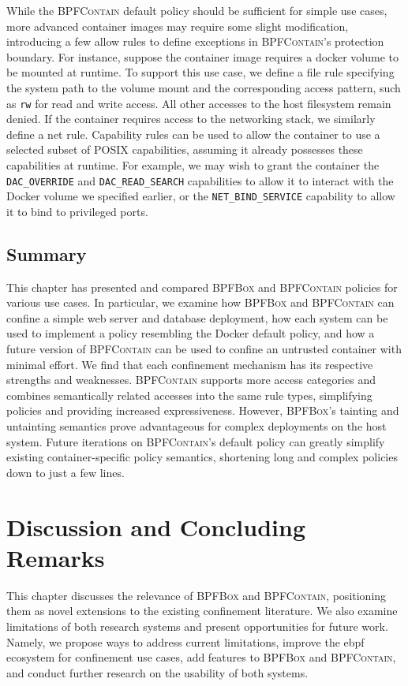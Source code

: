 \documentclass[
  fontsize=12pt,
  titlepage=firstiscover,
  paper=letter,
oneside,
  cleardoublepage=plain,
  parskip=half-,
  DIV=10,
  parindent,
  appendixprefix,
  chapterprefix,
  listof=totoc,
]{scrbook}
\newcommand{\bpfbox}{\textsc{BPFBox}}
\newcommand{\bpfcontain}{\textsc{BPFContain}}
\begin{document}
While the \bpfcontain{} default policy should be sufficient for simple use cases, more
advanced container images may require some slight modification, introducing a few allow
rules to define exceptions in \bpfcontain{}'s protection boundary. For instance, suppose
the container image requires a docker volume to be mounted at runtime. To support this use
case, we define a file rule specifying the system path to the volume mount and the
corresponding access pattern, such as \texttt{rw} for read and write access. All other
accesses to the host filesystem remain denied. If the container requires access to the
networking stack, we similarly define a net rule.  Capability rules can be used to allow
the container to use a selected subset of POSIX capabilities, assuming it already
possesses these capabilities at runtime. For example, we may wish to grant the container
the \texttt{DAC\_OVERRIDE} and \texttt{DAC\_READ\_SEARCH} capabilities to allow it to
interact with the Docker volume we specified earlier, or the \texttt{NET\_BIND\_SERVICE}
capability to allow it to bind to privileged ports.




\section{Summary}

This chapter has presented and compared \bpfbox{} and \bpfcontain{} policies for various
use cases. In particular, we examine how \bpfbox{} and \bpfcontain{} can confine a simple
web server and database deployment,  how each system can be used to implement a policy
resembling the Docker default policy, and how a future version of \bpfcontain{} can be
used to confine an untrusted container with minimal effort. We find that each confinement
mechanism has its respective strengths and weaknesses.  \bpfcontain{} supports more access
categories and combines semantically related accesses into the same rule types,
simplifying policies and providing increased expressiveness. However, \bpfbox{}'s tainting
and untainting semantics prove advantageous for complex deployments on the host system.
Future iterations on \bpfcontain{}'s default policy can greatly simplify existing
container-specific policy semantics, shortening long and complex policies down to just
a few lines.

\chapter{Discussion and Concluding Remarks}\label{c:discussion}
This chapter discusses the relevance of \bpfbox{} and \bpfcontain{}, positioning them as
novel extensions to the existing confinement literature. We also examine
limitations of both research systems and present opportunities for future work. Namely, we
propose ways to address current limitations, improve the \gls{ebpf} ecosystem for
confinement use cases, add features to \bpfbox{} and \bpfcontain{}, and conduct further
research on the usability of both systems.
\end{document}
